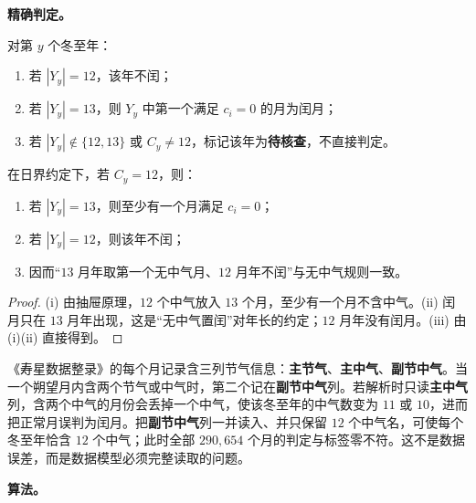 \textbf{精确判定。}

\begin{definition}[精确无中气置闰判定]
\label{def:exact_wuzhongqi_decision}
对第 \(y\) 个冬至年：
\begin{enumerate}[label=(\roman*)]
    \item 若 \(|Y_y|=12\)，该年不闰；
    \item 若 \(|Y_y|=13\)，则 \(Y_y\) 中第一个满足 \(c_i=0\) 的月为闰月；
    \item 若 \(|Y_y|\notin\{12,13\}\) 或 \(C_y\ne12\)，标记该年为\textbf{待核查}，不直接判定。
\end{enumerate}
\end{definition}

\begin{proposition}[精确判定的结构]
\label{prop:exact_wuzhongqi_consistency}
在日界约定下，若 \(C_y=12\)，则：
\begin{enumerate}[label=(\roman*)]
    \item 若 \(|Y_y|=13\)，则至少有一个月满足 \(c_i=0\)；
    \item 若 \(|Y_y|=12\)，则该年不闰；
    \item 因而“\(13\) 月年取第一个无中气月、\(12\) 月年不闰”与无中气规则一致。
\end{enumerate}
\end{proposition}

\begin{proof}
(i) 由抽屉原理，\(12\) 个中气放入 \(13\) 个月，至少有一个月不含中气。(ii) 闰月只在 \(13\) 月年出现，这是“无中气置闰”对年长的约定；\(12\) 月年没有闰月。(iii) 由 (i)(ii) 直接得到。
\end{proof}

\begin{remark}
\label{rem:main_secondary_terms}
《寿星数据整录》的每个月记录含三列节气信息：\textbf{主节气}、\textbf{主中气}、\textbf{副节中气}。当一个朔望月内含两个节气或中气时，第二个记在\textbf{副节中气}列。若解析时只读\textbf{主中气}列，含两个中气的月份会丢掉一个中气，使该冬至年的中气数变为 \(11\) 或 \(10\)，进而把正常月误判为闰月。把\textbf{副节中气}列一并读入、并只保留 \(12\) 个中气名，可使每个冬至年恰含 \(12\) 个中气；此时全部 \(290{,}654\) 个月的判定与标签零不符。这不是数据误差，而是数据模型必须完整读取的问题。
\end{remark}

\textbf{算法。}

